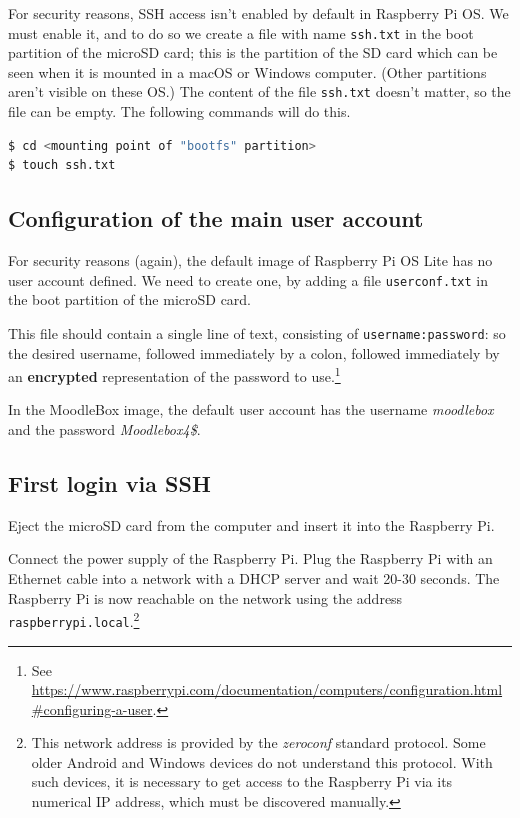 \documentclass[12pt]{article}
\begin{document}
For security reasons, SSH access isn't enabled by default in Raspberry Pi OS.
We must enable it, and to do so we create a file with name \lstinline{ssh.txt} in the boot partition of the microSD card;
this is the partition of the SD card which can be seen when it is mounted in a macOS or Windows computer.
(Other partitions aren't visible on these OS.)
The content of the file \lstinline{ssh.txt} doesn't matter, so the file can be empty.
The following commands will do this.

\begin{lstlisting}[language=bash]
$ cd <mounting point of "bootfs" partition>
$ touch ssh.txt
\end{lstlisting}

\subsection{Configuration of the main user account}\label{ssec-new-account}

For security reasons (again), the default image of Raspberry Pi OS Lite has no user account defined.
We need to create one, by adding a file \lstinline{userconf.txt} in the boot partition of the microSD card.

This file should contain a single line of text, consisting of \lstinline{username:password}: so the desired username, followed immediately by a colon, followed immediately by an \textbf{encrypted} representation of the password to use.\footnote{See \url{https://www.raspberrypi.com/documentation/computers/configuration.html\#configuring-a-user}.}

In the MoodleBox image, the default user account has the username \emph{moodlebox} and the password \emph{Moodlebox4\$}.

\subsection{First login via SSH}

Eject the microSD card from the computer and insert it into the Raspberry Pi.

Connect the power supply of the Raspberry Pi.
Plug the Raspberry Pi with an Ethernet cable into a network with a DHCP server and wait 20-30 seconds.
The Raspberry Pi is now reachable on the network using the address \lstinline{raspberrypi.local}.\footnote{This network address is provided by the \emph{zeroconf} standard protocol.
Some older Android and Windows devices do not understand this protocol.
With such devices, it is necessary to get access to the Raspberry Pi via its numerical IP address, which must be discovered manually.}
\end{document}
